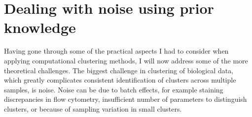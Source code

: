 
\section{Dealing with noise using prior knowledge}

Having gone through some of the practical aspects I had to consider when applying computational clustering methods, I will now address some of the more theoretical challenges.
The biggest challenge in clustering of biological data, which greatly complicates consistent identification of clusters across multiple samples, is noise.
Noise can be due to batch effects, for example staining discrepancies in flow cytometry, insufficient number of parameters to distinguish clusters, or because of sampling variation in small clusters.

